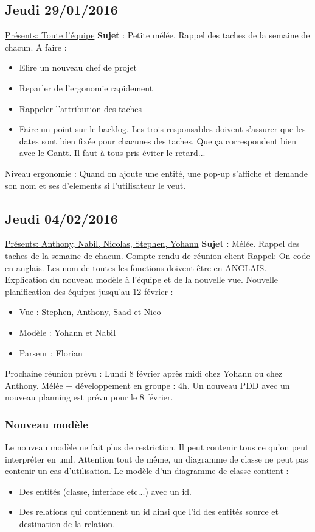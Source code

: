 \documentclass[a4paper,10pt]{article}
\begin{document}
\subsection{Jeudi 29/01/2016}
\underline{Présents: Toute l'équipe}  \newline
\textbf{Sujet} : Petite mélée. Rappel des taches de la semaine de chacun.
\newline
A faire :
\begin{itemize}
 \item Elire un nouveau chef de projet
 \item Reparler de l'ergonomie rapidement
 \item Rappeler l'attribution des taches
 \item Faire un point sur le backlog. Les trois responsables doivent s'assurer que les 
 dates sont bien fixée pour chacunes des taches. 
 Que ça correspondent bien avec le Gantt. Il faut à tous pris éviter le retard...
\end{itemize}
Niveau ergonomie : Quand on ajoute une entité, une pop-up s'affiche et demande son nom et ses d'elements si l'utilisateur le veut.

\subsection{Jeudi 04/02/2016}
\underline{Présents: Anthony, Nabil, Nicolas, Stephen, Yohann}  \newline
\textbf{Sujet} : Mélée. Rappel des taches de la semaine de chacun. Compte rendu de réunion client
\newline
Rappel: On code en anglais. Les nom de toutes les fonctions doivent être en ANGLAIS. \newline
Explication du nouveau modèle à l'équipe et de la nouvelle vue. Nouvelle planification des équipes jusqu'au 12 février :
\begin{itemize}
 \item Vue : Stephen, Anthony, Saad et Nico
 \item Modèle : Yohann et Nabil
 \item Parseur : Florian
\end{itemize}
Prochaine réunion prévu : Lundi 8 février après midi chez Yohann ou chez Anthony. Mélée + développement en groupe : 4h.\newline
Un nouveau PDD avec un nouveau planning est prévu pour le 8 février.
\subsubsection*{Nouveau modèle}
Le nouveau modèle ne fait plus de restriction. Il peut contenir tous ce qu'on peut interpréter en uml. Attention tout de même,
un diagramme de classe ne peut pas contenir un cas d'utilisation.
Le modèle d'un diagramme de classe contient :
\begin{itemize}
 \item Des entités (classe, interface etc...) avec un id.
 \item Des relations qui contiennent un id ainsi que l'id des entités source et destination de la relation.
\end{itemize}
\end{document}
